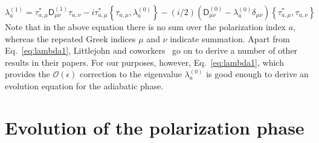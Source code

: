 %
\begin{equation}
  \lambda^{(1)}_{a} = \tau_{a,\mu}^{*}\mathsf{D}_{\mu\nu}^{(1)}\tau_{a,\nu} - i\tau_{a,\mu}^{*}\left\{\tau_{a,\mu}, \lambda^{(0)}_{a}\right\} - (i/2)\left(\mathsf{D}^{(0)}_{\mu\nu} - \lambda^{(0)}_{a}\delta_{\mu\nu}\right)\left\{\tau_{a,\mu}^{*}, \tau_{a,\nu}\right\}
  \label{eq:lambda1}
\end{equation}
%
Note that in the above equation there is no sum over the polarization index $a$, whereas the repeated Greek indices $\mu$ and $\nu$ indicate summation.
Apart from Eq.~\eqref{eq:lambda1}, Littlejohn and coworkers~\cite{littlejohn1991,littlejohn1991a,weigert1993} go on to derive a number of other results in their papers.
For our purposes, however, Eq.~\eqref{eq:lambda1}, which provides the $\mathcal{O}(\epsilon)$ correction to the eigenvalue $\lambda_{a}^{(0)}$ is good enough to derive an evolution equation for the adiabatic phase.

\section{Evolution of the polarization phase}

